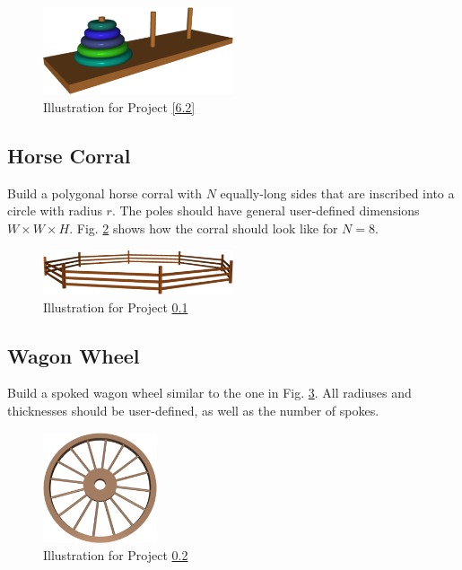 \begin{figure}[!ht]
\begin{center}
\includegraphics[width=0.5\textwidth]{img/hanoi.png}
\end{center}
\vspace{-2mm}
\caption{Illustration for Project \ref{6.2}}
\label{fig:hanoi}
\end{figure}
\noindent


\subsection{Horse Corral} \label{6.3}
Build a polygonal horse corral with $N$ equally-long sides that are inscribed into a circle with radius $r$.
The poles should have general user-defined dimensions $W \times W \times H$. Fig. \ref{fig:corral2} shows 
how the corral should look like for $N = 8$.

\begin{figure}[!ht]
\begin{center}
\includegraphics[width=0.5\textwidth]{img/tam-3.png}
\end{center}
\vspace{-2mm}
\caption{Illustration for Project \ref{6.3}}
\label{fig:corral2}
\end{figure}
\noindent


\subsection{Wagon Wheel} \label{6.4}
Build a spoked wagon wheel similar to the one in Fig. \ref{fig:wheel-1}. All radiuses 
and thicknesses should be user-defined, as well as the number of spokes.


\begin{figure}[!ht]
\begin{center}
\includegraphics[width=0.3\textwidth]{img/wagonwheel-1.png}
\end{center}
\vspace{-4mm}
\caption{Illustration for Project \ref{6.4}}
\label{fig:wheel-1}
\end{figure}
\noindent

